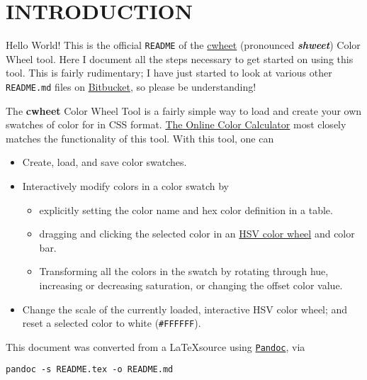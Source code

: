 \documentclass[]{article}
\author{Tanim Islam}
\date{\today}
\begin{document}
\section{INTRODUCTION}\label{introduction}

Hello World! This is the official \texttt{README} of the
\href{https://bitbucket.org/tanim_islam/cwheet}{cwheet} (pronounced
\textit{\textbf{shweet}}) Color Wheel tool. Here I document all the
steps necessary to get started on using this tool. This is fairly
rudimentary; I have just started to look at various other
\texttt{README.md} files on \href{https://bitbucket.org}{Bitbucket},
so please be understanding!

The \textbf{cwheet} Color Wheel Tool is a fairly simple way to load
and create your own swatches of color for in CSS
format. \href{http://www.sessions.edu/color-calculator}{The Online
 Color Calculator} most closely matches the functionality of this
tool. With this tool, one can
\begin{itemize}
  \item Create, load, and save color swatches.
  \item Interactively modify colors in a color swatch by
    \begin{itemize}
      \item explicitly setting the color name and hex color definition
        in a table.
      \item dragging and clicking the selected color in an
        \href{https://en.wikipedia.org/wiki/HSL_and_HSV}{HSV color
          wheel} and color bar.        
        \item Transforming all the colors in the swatch by rotating
          through hue, increasing or decreasing saturation, or
          changing the offset color value.
    \end{itemize}
  \item Change the scale of the currently loaded, interactive HSV
    color wheel; and reset a selected color to white
    (\texttt{\#FFFFFF}). 
\end{itemize}

This document was converted from a \LaTeX source using
\href{http://pandoc.org/index.html}{\texttt{Pandoc}}, via
\begin{verbatim}
pandoc -s README.tex -o README.md
\end{verbatim}
\end{document}
